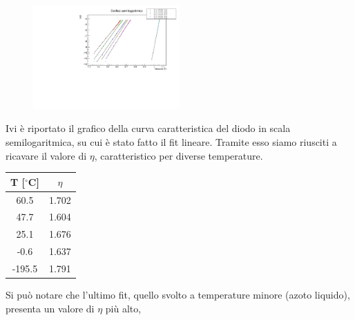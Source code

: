 \documentclass[10pt,twocolumn]{article}
\begin{document}
\begin{figure}[H] %
  \centering
  \includegraphics[width=0.5\textwidth]{scala_semilogaritmica.pdf} %
  \label{fig:I_V_}
\end{figure}
Ivi è riportato il grafico della curva caratteristica del diodo in scala semilogaritmica,
su cui è stato fatto il fit lineare. 
Tramite esso siamo riusciti a ricavare il valore di $\eta$, 
caratteristico per diverse temperature.

\begin{table}[H]
	\centering
	\begin{tabular}{|c|c|}
		\hline
		\textbf{T} [$^\circ$C] & \textbf{$\eta$} \\ \hline
    60.5 & 1.702 \\ \hline
    47.7 & 1.604 \\ \hline
    25.1 & 1.676 \\ \hline
    -0.6 & 1.637 \\ \hline
    -195.5 & 1.791 \\ \hline
	\end{tabular}
\end{table}
Si può notare che l'ultimo fit, quello svolto a temperature minore (azoto liquido), presenta un valore di $\eta$  più alto,
\end{document}
